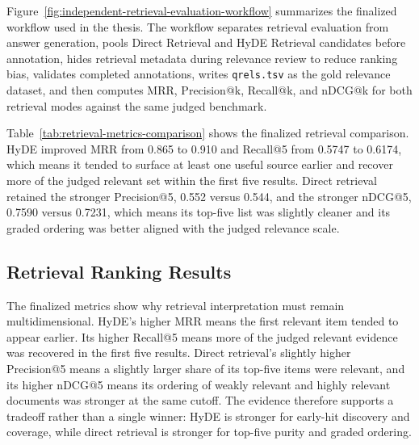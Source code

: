 Figure~\ref{fig:independent-retrieval-evaluation-workflow} summarizes the finalized workflow used in the thesis. The workflow separates retrieval evaluation from answer generation, pools Direct Retrieval and HyDE Retrieval candidates before annotation, hides retrieval metadata during relevance review to reduce ranking bias, validates completed annotations, writes \texttt{qrels.tsv} as the gold relevance dataset, and then computes MRR, Precision@k, Recall@k, and nDCG@k for both retrieval modes against the same judged benchmark.

\begin{table}[h]
\centering
\caption{Finalized independent retrieval ranking metrics for the June 2026 25-query benchmark.}
\label{tab:retrieval-metrics-comparison}

\end{table}

Table~\ref{tab:retrieval-metrics-comparison} shows the finalized retrieval comparison. HyDE improved MRR from 0.865 to 0.910 and Recall@5 from 0.5747 to 0.6174, which means it tended to surface at least one useful source earlier and recover more of the judged relevant set within the first five results. Direct retrieval retained the stronger Precision@5, 0.552 versus 0.544, and the stronger nDCG@5, 0.7590 versus 0.7231, which means its top-five list was slightly cleaner and its graded ordering was better aligned with the judged relevance scale.

\subsection{Retrieval Ranking Results}

The finalized metrics show why retrieval interpretation must remain multidimensional. HyDE's higher MRR means the first relevant item tended to appear earlier. Its higher Recall@5 means more of the judged relevant evidence was recovered in the first five results. Direct retrieval's slightly higher Precision@5 means a slightly larger share of its top-five items were relevant, and its higher nDCG@5 means its ordering of weakly relevant and highly relevant documents was stronger at the same cutoff. The evidence therefore supports a tradeoff rather than a single winner: HyDE is stronger for early-hit discovery and coverage, while direct retrieval is stronger for top-five purity and graded ordering.

